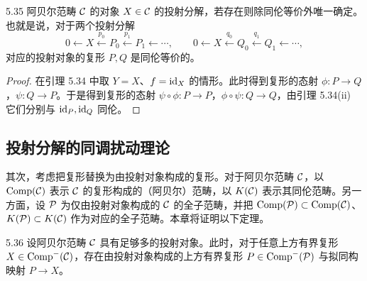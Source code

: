 
\begin{corollary}{5.35}
阿贝尔范畴 $\mathcal{C}$ 的对象 $X\in\mathcal{C}$ 的投射分解，若存在则除同伦等价外唯一确定。也就是说，对于两个投射分解
\[
  0\leftarrow X\xleftarrow{p_0}P_0\xleftarrow{p_1}P_1\leftarrow\cdots,\qquad
  0\leftarrow X\xleftarrow{q_0}Q_0\xleftarrow{q_1}Q_1\leftarrow\cdots,
\]
对应的投射对象的复形 $P, Q$ 是同伦等价的。
\end{corollary}

\begin{proof}
在引理 5.34 中取 $Y=X$、$f=\mathrm{id}_X$ 的情形。此时得到复形的态射 $\phi\colon P\to Q$，$\psi\colon Q\to P$。于是得到复形的态射 $\psi\circ\phi\colon P\to P$，$\phi\circ\psi\colon Q\to Q$，由引理 5.34(ii) 它们分别与 $\mathrm{id}_P, \mathrm{id}_Q$ 同伦。
\end{proof}

\subsection{投射分解的同调扰动理论}

其次，考虑把复形替换为由投射对象构成的复形。对于阿贝尔范畴 $\mathcal{C}$，以 $\operatorname{Comp}(\mathcal{C})$ 表示 $\mathcal{C}$ 的复形构成的（阿贝尔）范畴，以 $K(\mathcal{C})$ 表示其同伦范畴。另一方面，设 $\mathcal{P}$ 为仅由投射对象构成的 $\mathcal{C}$ 的全子范畴，并把 $\operatorname{Comp}(\mathcal{P})\subset\operatorname{Comp}(\mathcal{C})$、$K(\mathcal{P})\subset K(\mathcal{C})$ 作为对应的全子范畴。本章将证明以下定理。

\begin{theorem}{5.36}
设阿贝尔范畴 $\mathcal{C}$ 具有足够多的投射对象。此时，对于任意上方有界复形 $X\in\operatorname{Comp}^-(\mathcal{C})$，存在由投射对象构成的上方有界复形 $P\in\operatorname{Comp}^-(\mathcal{P})$ 与拟同构映射 $P\to X$。
\end{theorem}


